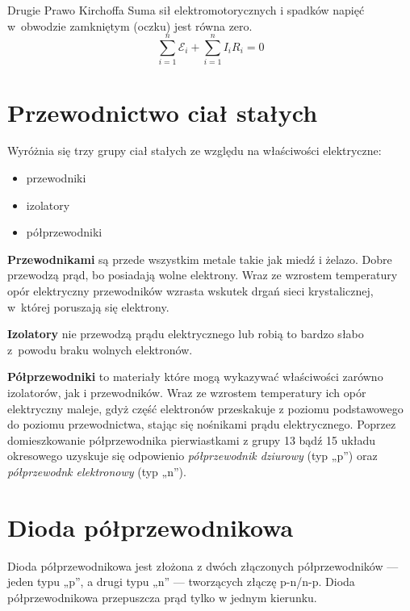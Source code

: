   \begin{law}{Drugie Prawo Kirchoffa}
    Suma sił elektromotorycznych i spadków napięć w~obwodzie zamkniętym (oczku) jest równa zero.
    \begin{equation}
      \sum_{i=1}^n \mathcal E_i + \sum_{i=1}^n I_iR_i = 0
    \end{equation}
  \end{law}

  \section{Przewodnictwo ciał stałych}
    Wyróżnia się trzy grupy ciał stałych ze względu na właściwości elektryczne:
    \begin{itemize}
      \item przewodniki
      \item izolatory
      \item półprzewodniki
    \end{itemize}

    \textbf{Przewodnikami} są przede wszystkim metale takie jak miedź i żelazo. Dobre przewodzą prąd, bo posiadają wolne elektrony. Wraz ze wzrostem temperatury opór elektryczny przewodników wzrasta wskutek drgań sieci krystalicznej, w~której poruszają się elektrony.

    \textbf{Izolatory} nie przewodzą prądu elektrycznego lub robią to bardzo słabo z~powodu braku wolnych elektronów.

    \textbf{Półprzewodniki} to materiały które mogą wykazywać właściwości zarówno izolatorów, jak i przewodników. Wraz ze wzrostem temperatury ich opór elektryczny maleje, gdyż część elektronów przeskakuje z poziomu podstawowego do poziomu przewodnictwa, stając się nośnikami prądu elektrycznego. Poprzez domieszkowanie półprzewodnika pierwiastkami z grupy 13 bądź 15 układu okresowego uzyskuje się odpowienio \emph{półprzewodnik dziurowy} (typ „p”) oraz \emph{półprzewodnk elektronowy} (typ „n”).

  \section{Dioda półprzewodnikowa}
    Dioda półprzewodnikowa jest złożona z dwóch złączonych półprzewodników --- jeden typu „p”, a drugi typu „n” --- tworzących złączę p-n/n-p. Dioda półprzewodnikowa przepuszcza prąd tylko w jednym kierunku.
